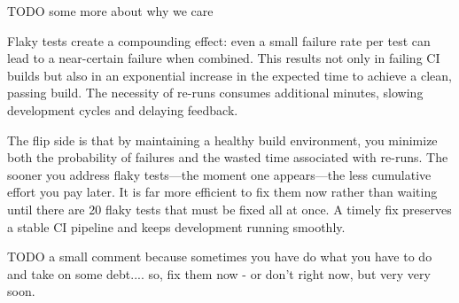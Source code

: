 \documentclass[letterpaper]{article}
\begin{document}
TODO some more about why we care

Flaky tests create a compounding effect: even a small failure rate per test can lead to a near-certain failure when combined. This results not only in failing CI builds but also in an exponential increase in the expected time to achieve a clean, passing build. The necessity of re-runs consumes additional minutes, slowing development cycles and delaying feedback.

The flip side is that by maintaining a healthy build environment, you minimize both the probability of failures and the wasted time associated with re-runs. The sooner you address flaky tests—the moment one appears—the less cumulative effort you pay later. It is far more efficient to fix them now rather than waiting until there are 20 flaky tests that must be fixed all at once. A timely fix preserves a stable CI pipeline and keeps development running smoothly.

TODO a small comment because sometimes you have do what you have to do and take on some debt....  so, fix them now - or don't right now, but very very soon.
\end{document}
